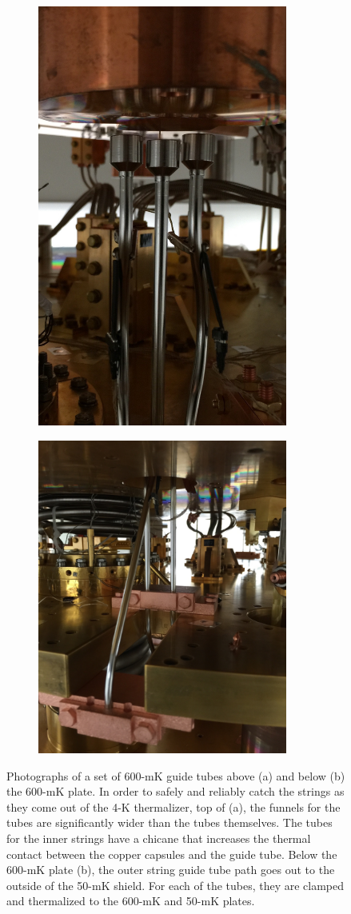 \begin{figure}[htbp]
\centering
\begin{subfigure}[t]{0.37\textwidth}
\centering
\includegraphics[width=0.9\textwidth, height= 3 in, keepaspectratio]{Figures/600mKguidetube_cropped.jpg}
\caption{}
\label{fig:600mk_guide_tubes_top}
\end{subfigure}
\qquad
\begin{subfigure}[t]{0.5\textwidth}
\centering
\includegraphics[width=0.9\textwidth, height = 3 in, keepaspectratio]{Figures/600mKguidetube_below_cropped.jpg}
\caption{}
\label{fig:600mk_guide_tubes_bottom}
\end{subfigure}
\caption[Photographs of a set of 600-mK guide tubes above (a) and below (b) the 600-mK plate]
{Photographs of a set of 600-mK guide tubes above (a) and below (b) the 600-mK plate.
In order to safely and reliably catch the strings as they come out of the 4-K thermalizer, top of (a), the funnels for the tubes are significantly wider than the tubes themselves.
The tubes for the inner strings have a chicane that increases the thermal contact between the copper capsules and the guide tube.
Below the 600-mK plate (b), the outer string guide tube path goes out to the outside of the 50-mK shield.
For each of the tubes, they are clamped and thermalized to the 600-mK and 50-mK plates.}
\label{fig:600mK_guide_tubes}
\end{figure}

